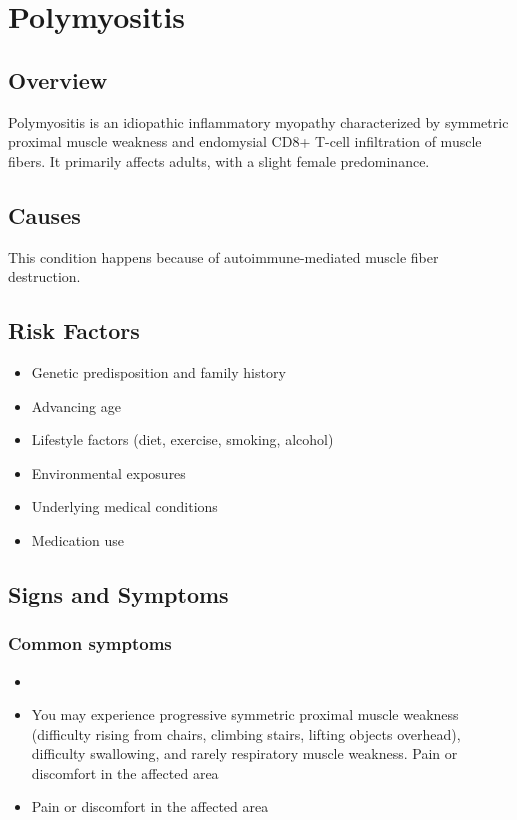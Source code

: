 \chapter{Polymyositis}
\label{sec:Polymyositis}

\section{Overview}
Polymyositis is an idiopathic inflammatory myopathy characterized by symmetric proximal muscle weakness and endomysial CD8+ T-cell infiltration of muscle fibers. It primarily affects adults, with a slight female predominance.
\section{Causes}
This condition happens because of autoimmune-mediated muscle fiber destruction.     
\section{Risk Factors}

\begin{itemize}[noitemsep]
  \item Genetic predisposition and family history
  \item Advancing age
  \item Lifestyle factors (diet, exercise, smoking, alcohol)
  \item Environmental exposures
  \item Underlying medical conditions
  \item Medication use
\end{itemize}
\section{Signs and Symptoms}

\subsection{Common symptoms}
\begin{itemize}[noitemsep]
  \item \item You may experience progressive symmetric proximal muscle weakness (difficulty rising from chairs, climbing stairs, lifting objects overhead), difficulty swallowing, and rarely respiratory muscle weakness. Pain or discomfort in the affected area    \item Pain or discomfort in the affected area
  \end{itemize}

